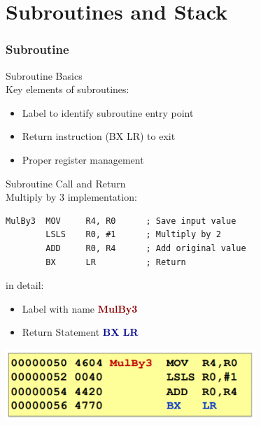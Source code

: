 \section{Subroutines and Stack}

\subsubsection{Subroutine}

\begin{concept}{Subroutine Basics}\\
Key elements of subroutines:
\begin{itemize}
  \item Label to identify subroutine entry point
  \item Return instruction (BX LR) to exit
  \item Proper register management
\end{itemize}
\end{concept}

\begin{example2}{Subroutine Call and Return}\\
Multiply by 3 implementation:
\begin{lstlisting}[language=armasm, style=basesmol]
MulBy3  MOV     R4, R0      ; Save input value
        LSLS    R0, #1      ; Multiply by 2
        ADD     R0, R4      ; Add original value
        BX      LR          ; Return
\end{lstlisting}

in detail:
\begin{itemize}
  \item Label with name \textcolor{darkred}{\textbf{MulBy3}}
  \item Return Statement \textcolor{darkblue}{\textbf{BX LR}}
\end{itemize}

\includegraphics[width=0.7\linewidth]{images/subroutine.png}
\end{example2}

